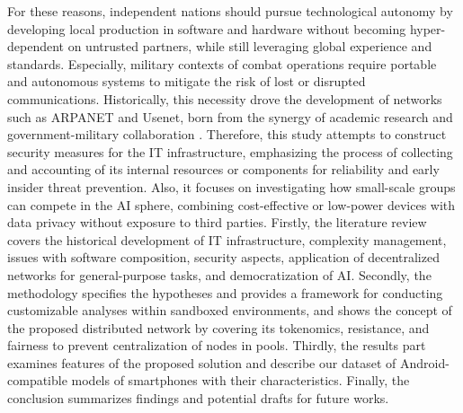 For these reasons, independent nations should pursue technological autonomy by developing local production in software and hardware without becoming hyper-dependent on untrusted partners, while still leveraging global experience and standards. Especially, military contexts of combat operations require portable and autonomous systems to mitigate the risk of lost or disrupted communications. Historically, this necessity drove the development of networks such as ARPANET and Usenet, born from the synergy of academic research and government-military collaboration \cite{leiner2009brief}. Therefore, this study attempts to construct security measures for the IT infrastructure, emphasizing the process of collecting and accounting of its internal resources or components for reliability and early insider threat prevention. Also, it focuses on investigating how small-scale groups can compete in the AI sphere, combining cost-effective or low-power devices with data privacy without exposure to third parties. Firstly, the literature review covers the historical development of IT infrastructure, complexity management, issues with software composition, security aspects, application of decentralized networks for general-purpose tasks, and democratization of AI. Secondly, the methodology specifies the hypotheses and provides a framework for conducting customizable analyses within sandboxed environments, and shows the concept of the proposed distributed network by covering its tokenomics, resistance, and fairness to prevent centralization of nodes in pools. Thirdly, the results part examines features of the proposed solution and describe our dataset of Android-compatible models of smartphones with their characteristics. Finally, the conclusion summarizes findings and potential drafts for future works.
